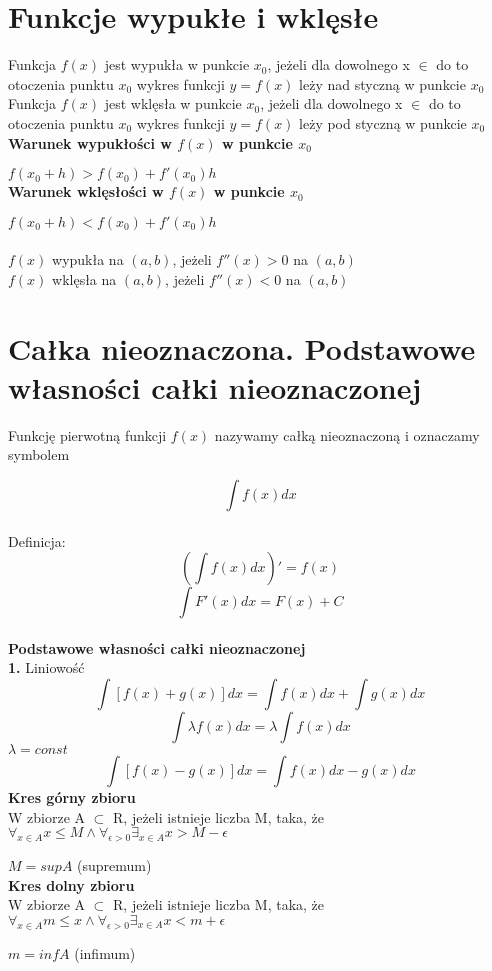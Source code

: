 \documentclass[10pt]{article}
\begin{document}
    \section{Funkcje wypukłe i wklęsłe}
    Funkcja $f(x)$ jest wypukła w punkcie $x_0$, jeżeli dla dowolnego x $\in$ do to otoczenia punktu $x_0$ wykres funkcji  $y=f(x)$ leży nad styczną w punkcie $x_0$ \\
    Funkcja $f(x)$ jest wklęsła w punkcie $x_0$, jeżeli dla dowolnego x $\in$ do to otoczenia punktu $x_0$ wykres funkcji  $y=f(x)$ leży pod styczną w punkcie $x_0$ \\
    \textbf{Warunek wypukłości w $f(x)$ w punkcie $x_0$} \par
    $f(x_0+h)>f(x_0)+f'(x_0)h$ \\
    \textbf{Warunek wklęsłości w $f(x)$ w punkcie $x_0$} \par
    $f(x_0+h)<f(x_0)+f'(x_0)h$ \\ \\
    $f(x)$ wypukła na $(a,b)$, jeżeli $f''(x)>0$ na $(a,b)$\\
    $f(x)$ wklęsła na $(a,b)$, jeżeli $f''(x)<0$ na $(a,b)$\\
\section{Całka nieoznaczona. Podstawowe własności całki nieoznaczonej}
    Funkcję pierwotną funkcji $f(x)$ nazywamy całką nieoznaczoną i oznaczamy symbolem \par
    $$\int f(x)dx$$ \\
    Definicja:
    $$(\int f(x)dx)' = f(x)$$ $$ \int F'(x)dx=F(x) + C $$ \\
    \textbf{Podstawowe własności całki nieoznaczonej} \\
    \textbf{1.} Liniowość 
    $$\int[f(x)+g(x)]dx = \int f(x)dx + \int g(x)dx$$
    $$\int \lambda f(x)dx = \lambda \int f(x)dx  $$ $\lambda = const$ 
    $$\int[f(x)-g(x)]dx = \int f(x)dx - g(x)dx$$
    \textbf{Kres górny zbioru} \\
    W zbiorze A $\subset$ R, jeżeli istnieje liczba M, taka, że
    $\forall_{x \in A} x \leq M \wedge \forall_{\epsilon>0} \exists_{x\in A} x > M - \epsilon$ \par
    $M=supA$ (supremum) \\
    \textbf{Kres dolny zbioru} \\
    W zbiorze A $\subset$ R, jeżeli istnieje liczba M, taka, że
    $\forall_{x \in A} m \leq x \wedge \forall_{\epsilon>0} \exists_{x\in A} x < m+ \epsilon$\par
    $m=infA$ (infimum)
\end{document}
